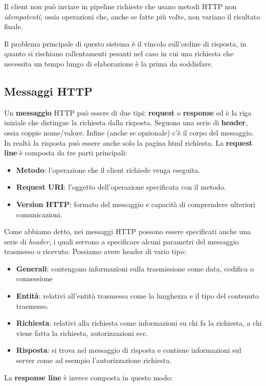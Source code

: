 Il client non può inviare in pipeline richieste che usano metodi HTTP non \emph{idempotenti}, ossia
operazioni che, anche se fatte più volte, non variano il risultato finale.

Il problema principale di questo sistema è il vincolo sull'ordine di risposta, in quanto si
rischiano rallentamenti pesanti nel caso in cui una richiesta che necessita un tempo lungo di 
elaborazione è la prima da soddisfare.

\subsection{Messaggi HTTP}
Un \textbf{messaggio} HTTP può essere di due tipi: \textbf{request} o \textbf{response} ed è la
riga iniziale che distingue la richiesta dalla risposta. Seguono una serie di \textbf{header},
ossia coppie nome/valore. Infine (anche se opzionale) c'è il corpo del messaggio. In realtà
la risposta può essere anche solo la pagina html richiesta. La \textbf{request line} è composta da
tre parti principali:
\begin{itemize}
	\item \textbf{Metodo}: l'operazione che il client richiede venga eseguita.
	\item \textbf{Request URI}: l'oggetto dell'operazione specificata con il metodo.
	\item \textbf{Version HTTP}: formato del messaggio e capacità di comprendere ulteriori
		comunicazioni.
\end{itemize}
Come abbiamo detto, nei messaggi HTTP possono essere specificati anche una serie di \emph{header},
i quali servono a specificare alcuni parametri del messaggio trasmesso o ricevuto. Possiamo avere 
header di vario tipo:
\begin{itemize}
	\item \textbf{Generali}: contengono informazioni sulla trasmissione come data, codifica o
		connessione
	\item \textbf{Entità}: relativi all'entità trasmessa come la lunghezza e il tipo del contenuto
		trasmesso.
	\item \textbf{Richiesta}: relativi alla richiesta come informazioni su chi fa la richiesta, a 
		chi viene fatta la richiesta, autorizzazioni ecc.
	\item \textbf{Risposta}: si trova nel messaggio di risposta e contiene informazioni sul server
		come ad esempio l'autorizzazione richiesta.
\end{itemize}
La \textbf{response line} è invece composta in questo modo:
